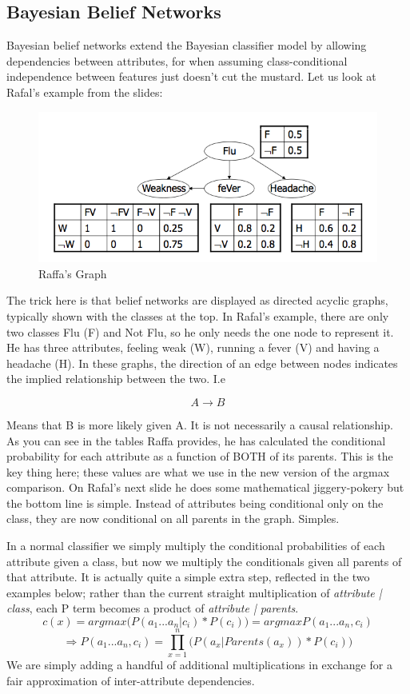 \documentclass{article}
\begin{document}
    \subsection{Bayesian Belief Networks}
        Bayesian belief networks extend the Bayesian classifier model by allowing dependencies between attributes, for when assuming class-conditional independence between features just doesn't cut the mustard. Let us look at Rafal's example from the slides:
        \begin{figure}[h]
            \centering
            \includegraphics[scale=0.5]{images/slidebbn.png}
            \caption{Raffa's Graph}
        \end{figure}
        The trick here is that belief networks are displayed as directed acyclic graphs, typically shown with the classes at the top. In Rafal's example, there are only two classes Flu (F) and Not Flu, so he only needs the one node to represent it. He has three attributes, feeling weak (W), running a fever (V) and having a headache (H).
        In these graphs, the direction of an edge between nodes indicates the implied relationship between the two. I.e
        
        $$A\rightarrow B$$
    
    Means that B is more likely given A. It is not necessarily a causal relationship. As you can see in the tables Raffa provides, he has calculated the conditional probability for each attribute as a function of BOTH of its parents. This is the key thing here; these values are what we use in the new version of the argmax comparison. On Rafal's next slide he does some mathematical jiggery-pokery but the bottom line is simple. Instead of attributes being conditional only on the class, they are now conditional on all parents in the graph. Simples.
    
    In a normal classifier we simply multiply the conditional probabilities of each attribute given a class, but now we multiply the conditionals given all parents of that attribute. It is actually quite a simple extra step, reflected in the two examples below; rather than the current straight multiplication of \emph{attribute | class}, each P term becomes a product of \emph{attribute | parents}.
    $$
        c(x) = arg max \big(P(a_{1}...a_{n} | c_{i})*P(c_{i})\big) = argmax P(a_{1}...a_{n},c_{i})
    $$
    $$
        \Rightarrow P(a_{1}...a_{n},c_{i}) = \prod_{x = 1}^{n}\big(P(a_{x} | Parents(a_{x}))*P(c_{i})\big)
    $$
    We are simply adding a handful of additional multiplications in exchange for a fair approximation of inter-attribute dependencies.
    
\end{document}
